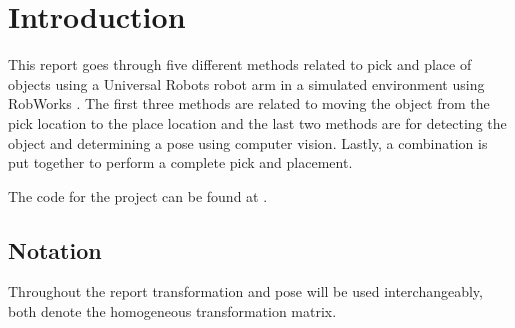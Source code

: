 \documentclass[../main.tex]{subfiles}
\begin{document}
\section{Introduction} \label{sec:introduction}
This report goes through five different methods related to pick and place of objects using a Universal Robots robot arm in a simulated environment using RobWorks \cite{robwork}. The first three methods are related to moving the object from the pick location to the place location and the last two methods are for detecting the object and determining a pose using computer vision. Lastly, a combination is put together to perform a complete pick and placement.

The code for the project can be found at \cite{code}.

\subsection*{Notation}
Throughout the report transformation and pose will be used interchangeably, both denote the homogeneous transformation matrix.
\end{document}
